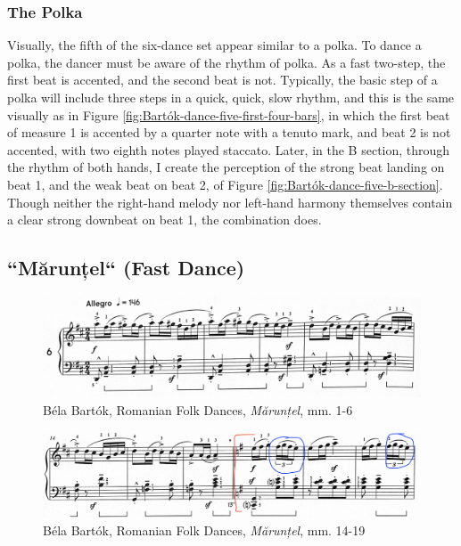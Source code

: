 \subsubsection{The Polka}

Visually, the fifth of the six-dance set appear similar to a polka. To dance a polka, the dancer must be aware of the rhythm of polka. As a fast two-step, the first beat is accented, and the second beat is not. Typically, the basic step of a polka will include three steps in a quick, quick, slow rhythm, and this is the same visually as in Figure \ref{fig:Bartók-dance-five-first-four-bars}\autocite{Lung_2016}, in which the first beat of measure 1 is accented by a quarter note with a tenuto mark, and beat 2 is not accented, with two eighth notes played staccato. Later, in the B section, through the rhythm of both hands, I create the perception of the strong beat landing on beat 1, and the weak beat on beat 2, of Figure \ref{fig:Bartók-dance-five-b-section}\autocite{Lung_2016}. Though neither the right-hand melody nor left-hand harmony themselves contain a clear strong downbeat on beat 1, the combination does. 

\subsection{``Mărunțel`` (Fast Dance)}

\begin{figure}
  \centering
  \includegraphics[width=\textwidth]{figures/bartok-dance-six-first-line.jpg}
  \caption{Béla Bartók, Romanian Folk Dances, \textit{Mărunțel}, mm. 1-6}
  \label{fig:Bartók-dance-six-first-line}
\end{figure}

\begin{figure}
  \centering
  \includegraphics[width=\textwidth]{figures/bartok-dance-six-b-section.jpg}
  \caption{Béla Bartók, Romanian Folk Dances, \textit{Mărunțel}, mm. 14-19}
  \label{fig:Bartók-dance-six-b-section}
\end{figure}

